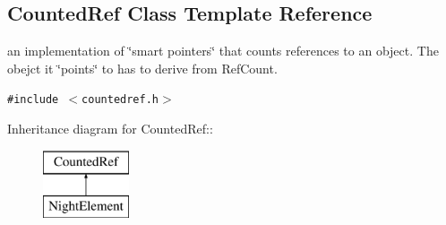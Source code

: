 \subsection{Counted\-Ref  Class Template Reference}
\label{class_countedref}
an implementation of \char`\"{}smart pointers\char`\"{} that counts references to an object. The obejct it \char`\"{}points\char`\"{} to has to derive from Ref\-Count. 


{\tt \#include $<$countedref.h$>$}

Inheritance diagram for Counted\-Ref::\begin{figure}[H]
\begin{center}
\leavevmode
\includegraphics[height=2cm]{class_countedref}
\end{center}
\end{figure}
